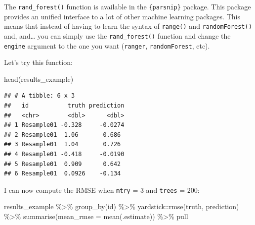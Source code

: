 \documentclass[
]{article}
\newenvironment{Shaded}{\begin{snugshade}}{\end{snugshade}}
\newcommand{\AttributeTok}[1]{\textcolor[rgb]{0.77,0.63,0.00}{#1}}
\newcommand{\DecValTok}[1]{\textcolor[rgb]{0.00,0.00,0.81}{#1}}
\newcommand{\FunctionTok}[1]{\textcolor[rgb]{0.00,0.00,0.00}{#1}}
\newcommand{\NormalTok}[1]{#1}
\newcommand{\OtherTok}[1]{\textcolor[rgb]{0.56,0.35,0.01}{#1}}
\newcommand{\SpecialCharTok}[1]{\textcolor[rgb]{0.00,0.00,0.00}{#1}}
\begin{document}
The \texttt{rand\_forest()} function is available in the \texttt{\{parsnip\}} package. This package provides an
unified interface to a lot of other machine learning packages. This means that instead of having to
learn the syntax of \texttt{range()} and \texttt{randomForest()} and, and\ldots{} you can simply use the \texttt{rand\_forest()}
function and change the \texttt{engine} argument to the one you want (\texttt{ranger}, \texttt{randomForest}, etc).

Let's try this function:

\begin{Shaded}
\end{Shaded}

\begin{Shaded}
\begin{Highlighting}[]
\FunctionTok{head}\NormalTok{(results\_example)}
\end{Highlighting}
\end{Shaded}

\begin{verbatim}
## # A tibble: 6 x 3
##   id           truth prediction
##   <chr>        <dbl>      <dbl>
## 1 Resample01 -0.328     -0.0274
## 2 Resample01  1.06       0.686 
## 3 Resample01  1.04       0.726 
## 4 Resample01 -0.418     -0.0190
## 5 Resample01  0.909      0.642 
## 6 Resample01  0.0926    -0.134
\end{verbatim}

I can now compute the RMSE when \texttt{mtry} = 3 and \texttt{trees} = 200:

\begin{Shaded}
\begin{Highlighting}[]
\NormalTok{results\_example }\SpecialCharTok{\%\textgreater{}\%}
    \FunctionTok{group\_by}\NormalTok{(id) }\SpecialCharTok{\%\textgreater{}\%}
\NormalTok{    yardstick}\SpecialCharTok{::}\FunctionTok{rmse}\NormalTok{(truth, prediction) }\SpecialCharTok{\%\textgreater{}\%}
    \FunctionTok{summarise}\NormalTok{(}\AttributeTok{mean\_rmse =} \FunctionTok{mean}\NormalTok{(.estimate)) }\SpecialCharTok{\%\textgreater{}\%}
\NormalTok{    pull}
\end{Highlighting}
\end{Shaded}
\end{document}
